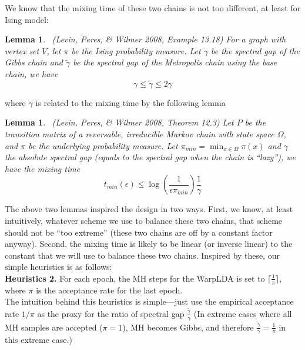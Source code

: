 \documentclass[10pt,journal,cspaper,compsoc]{IEEEtran}
\newtheorem{lemma}[theorem]{Lemma}
\begin{document}
	We know that the mixing time of these two chains is not too different,
	at least for Ising model:
	

	\begin{lemma}~\cite{levin2009markov}(Levin, Peres, \& Wilmer 2008, Example 13.18)
		For a graph with vertex set $V$, let $\pi$ be the Ising
		probability measure. Let $\gamma$ be the spectral gap
		of the Gibbs chain and $\tilde{\gamma}$ be the spectral gap
		of the Metropolis chain using the base chain, we have
		\[
		\gamma \le \tilde{\gamma} \le 2\gamma
		\]
	\end{lemma}
	where $\gamma$ is related to the mixing time
	by the following lemma

	\begin{lemma}~\cite{levin2009markov}(Levin, Peres, \& Wilmer 2008, Theorem 12.3)
		Let $P$ be the transition matrix of a reversable, irreducible
		Markov chain with state space $\Omega$, and $\pi$ be the
		underlying probability measure. Let $\pi_{min} = \min_{x\in \Omega} \pi(x)$
		and $\gamma$ the absolute spectral gap (equals to the spectral gap
		when the chain is ``lazy''), we have the mixing time
		\[
		t_{min}(\epsilon) \le \log(\frac{1}{\epsilon \pi_{min}})\frac{1}{\gamma}
		\]
	\end{lemma}
	
	The above two lemmas inspired the design in two ways.
	First, we know, at least intuitively, whatever scheme
	we use to balance these two chains, that scheme should
	not be ``too extreme'' (these two chains are off by a
	constant factor anyway). Second, the mixing time is
	likely to be linear (or inverse linear) to the constant
	that we will use to balance these two chains. Inspired
	by these, our simple heuristics is as follows:\\
	

	\noindent
	\textbf{Heuristics 2.} For each epoch, the MH steps for the WarpLDA
	is set to $\lceil\frac{1}{\pi}\rceil$,
	where $\pi$ is the acceptance rate for the last epoch.\\
	

	The intuition behind this heuristics is simple---just use
	the empirical acceptance rate $1 / \pi$ as the proxy for
	the ratio of spectral gap $\frac{\tilde{\gamma}}{\gamma}$
	(In extreme cases where all MH samples are accepted ($\pi=1$),
	MH becomes Gibbs, and therefore $\frac{\tilde{\gamma}}{\gamma}=\frac{1}{\pi}$
	in this extreme case.)
	
	
	
\end{document}
